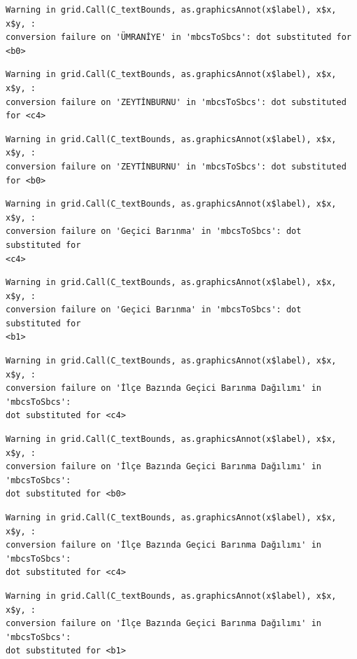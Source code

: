 \documentclass[
  11pt,
  a4paper,
  DIV=11,
  numbers=noendperiod]{scrartcl}
\begin{document}
\begin{verbatim}
Warning in grid.Call(C_textBounds, as.graphicsAnnot(x$label), x$x, x$y, :
conversion failure on 'ÜMRANİYE' in 'mbcsToSbcs': dot substituted for <b0>
\end{verbatim}

\begin{verbatim}
Warning in grid.Call(C_textBounds, as.graphicsAnnot(x$label), x$x, x$y, :
conversion failure on 'ZEYTİNBURNU' in 'mbcsToSbcs': dot substituted for <c4>
\end{verbatim}

\begin{verbatim}
Warning in grid.Call(C_textBounds, as.graphicsAnnot(x$label), x$x, x$y, :
conversion failure on 'ZEYTİNBURNU' in 'mbcsToSbcs': dot substituted for <b0>
\end{verbatim}

\begin{verbatim}
Warning in grid.Call(C_textBounds, as.graphicsAnnot(x$label), x$x, x$y, :
conversion failure on 'Geçici Barınma' in 'mbcsToSbcs': dot substituted for
<c4>
\end{verbatim}

\begin{verbatim}
Warning in grid.Call(C_textBounds, as.graphicsAnnot(x$label), x$x, x$y, :
conversion failure on 'Geçici Barınma' in 'mbcsToSbcs': dot substituted for
<b1>
\end{verbatim}

\begin{verbatim}
Warning in grid.Call(C_textBounds, as.graphicsAnnot(x$label), x$x, x$y, :
conversion failure on 'İlçe Bazında Geçici Barınma Dağılımı' in 'mbcsToSbcs':
dot substituted for <c4>
\end{verbatim}

\begin{verbatim}
Warning in grid.Call(C_textBounds, as.graphicsAnnot(x$label), x$x, x$y, :
conversion failure on 'İlçe Bazında Geçici Barınma Dağılımı' in 'mbcsToSbcs':
dot substituted for <b0>
\end{verbatim}

\begin{verbatim}
Warning in grid.Call(C_textBounds, as.graphicsAnnot(x$label), x$x, x$y, :
conversion failure on 'İlçe Bazında Geçici Barınma Dağılımı' in 'mbcsToSbcs':
dot substituted for <c4>
\end{verbatim}

\begin{verbatim}
Warning in grid.Call(C_textBounds, as.graphicsAnnot(x$label), x$x, x$y, :
conversion failure on 'İlçe Bazında Geçici Barınma Dağılımı' in 'mbcsToSbcs':
dot substituted for <b1>
\end{verbatim}
\end{document}
